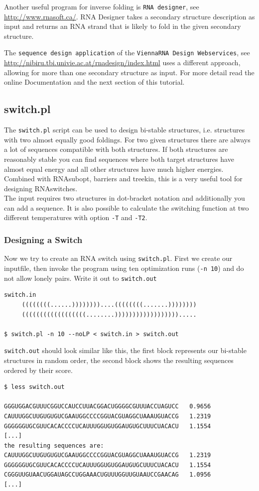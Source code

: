 \documentclass[a4paper]{article}
\newcommand{\frametitle}[1]{\subsubsection{#1}}
\newcommand{\TODO}[1]{{\textcolor{red}{* #1 *}}}
\begin{document}
Another useful program for inverse folding is \texttt{RNA designer}, see
\url{http://www.rnasoft.ca/}. RNA Designer takes a secondary structure 
description as input and returns an RNA strand that is likely to fold in the 
given secondary structure.

The \texttt{sequence design application} of the \texttt{ViennaRNA Design Webservices},
see \url{http://nibiru.tbi.univie.ac.at/rnadesign/index.html} uses a different approach,
allowing for more than one secondary structure as input. For more detail read the online
Documentation and the next section of this tutorial.

\subsection{switch.pl}
The \texttt{switch.pl} script can be used to design bi-stable structures,
i.e. structures with two almost equally good foldings. For two given structures
there are always a lot of sequences compatible with both structures. If both 
structures are reasonably stable you can find sequences where both target 
structures have almost equal energy and all other structures have much higher energies.
Combined with RNAsubopt, barriers and treekin, this is a very useful tool for 
designing RNAswitches. \\

The input requires two structures in dot-bracket notation
and additionally you can add a sequence. It is also possible to calculate the 
switching function at two different temperatures with option \texttt{-T} and \texttt{-T2}.

\frametitle{Designing a Switch}
\noindent Now we try to create an RNA switch using \texttt{switch.pl}.
First we create our inputfile, then invoke the program using ten optimization runs 
(\texttt{-n 10}) and do not allow lonely pairs. Write it out to \texttt{switch.out}
\begin{verbatim}
switch.in
     ((((((((......))))))))....((((((((.......))))))))
     ((((((((((((((((((........)))))))))))))))))).....

$ switch.pl -n 10 --noLP < switch.in > switch.out
\end{verbatim}

\texttt{switch.out} should look similar like this, the first block represents our
bi-stable structures in random order, the second block shows the resulting sequences ordered by
their score.
\begin{verbatim}
$ less switch.out

GGGUGGACGUUUCGGUCCAUCCUUACGGACUGGGGCGUUUACCUAGUCC   0.9656
CAUUUGGCUUGUGUGUCGAAUGGCCCCGGUACGUAGGCUAAAUGUACCG   1.2319
GGGGGGUGCGUUCACACCCCUCAUUUGGUGUGGAUGUGCUUUCUACACU   1.1554
[...]
the resulting sequences are:
CAUUUGGCUUGUGUGUCGAAUGGCCCCGGUACGUAGGCUAAAUGUACCG   1.2319
GGGGGGUGCGUUCACACCCCUCAUUUGGUGUGGAUGUGCUUUCUACACU   1.1554
CGGGUUGUAACUGGAUAGCCUGGAAACUGUUUGGUUGUAAUCCGAACAG   1.0956
[...]
\end{verbatim}
\end{document}
